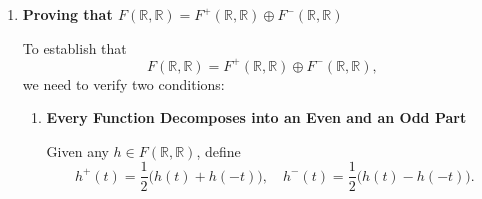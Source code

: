 \documentclass[12pt]{article}
\begin{document}
\begin{enumerate}[label=(\alph*)]
\begin{enumerate}[label=\arabic*.]
        \newpage

        \item \textbf{Closed Under Scalar Multiplication}
        
        \begin{itemize}
            \item \textbf{Even Subspace \(F^+\):}  
            Let \(f \in F^+(\mathbb{R}, \mathbb{R})\) and \(\alpha \in \mathbb{R}\). Then 
            \[
                f(-t) = f(t).
            \]
            Consider \(\alpha f\). We have
            \[
                (\alpha f)(-t) = \alpha f(-t) = \alpha f(t) = (\alpha f)(t).
            \]
            Hence \(\alpha f\) is even, so \(\alpha f \in F^+\).
            
            \item \textbf{Odd Subspace \(F^-\):}  
            Let \(f \in F^-(\mathbb{R}, \mathbb{R})\) and \(\alpha \in \mathbb{R}\). Then
            \[
                f(-t) = -f(t).
            \]
            Consider \(\alpha f\). We have
            \[
                (\alpha f)(-t) = \alpha f(-t) = \alpha (-f(t)) = -\alpha f(t) = -(\alpha f)(t).
            \]
            Hence \(\alpha f\) is odd, so \(\alpha f \in F^-\).
        \end{itemize}
    \end{enumerate}
    
    Since all three properties are satisfied for both \(F^+(\mathbb{R}, \mathbb{R})\) and \(F^-(\mathbb{R}, \mathbb{R})\), both are indeed \textbf{subspaces} of \(F(\mathbb{R}, \mathbb{R})\).

    \qed
    
    \item \textbf{Proving that \(F(\mathbb{R}, \mathbb{R}) = F^+(\mathbb{R}, \mathbb{R}) \oplus F^-(\mathbb{R}, \mathbb{R})\)}
    
    To establish that
    \[
        F(\mathbb{R}, \mathbb{R}) = F^+(\mathbb{R}, \mathbb{R}) \oplus F^-(\mathbb{R}, \mathbb{R}),
    \]
    we need to verify two conditions:
    
    \begin{enumerate}[label=\arabic*.]
        \item \textbf{Every Function Decomposes into an Even and an Odd Part}
        
        Given any \(h \in F(\mathbb{R}, \mathbb{R})\), define
        \[
            h^+(t) = \frac{1}{2}\bigl(h(t) + h(-t)\bigr), \quad h^-(t) = \frac{1}{2}\bigl(h(t) - h(-t)\bigr).
        \]
        

\end{enumerate}
\end{enumerate}
\end{document}

